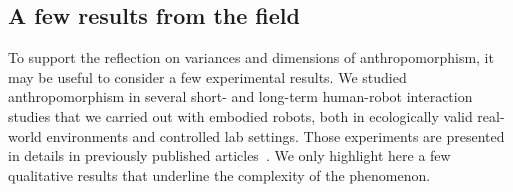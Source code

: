 \documentclass{frontiersSCNS} %
\begin{document}
\subsection{A few results from the field}
\label{sec:field-results}

To support the reflection on variances and dimensions of anthropomorphism, it may be 
useful to consider a few experimental
results. We studied anthropomorphism in several short- and long-term
human-robot interaction studies that we carried out with embodied robots, both
in ecologically valid real-world environments and controlled lab settings. Those
experiments are presented in details in previously published
articles~\citep{fink_anthropomorphic_2012, fink_living_2013, fink2014which,
lemaignan2014dynamics}. We only highlight here a few qualitative results that
underline the complexity of the phenomenon.
\end{document}
